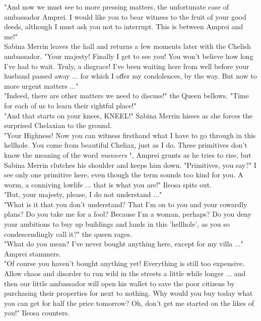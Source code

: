 "And now we must see to more pressing matters, the unfortunate case of ambassador Amprei. I would like you to bear witness to the fruit of your good deeds, although I must ask you not to interrupt. This is between Amprei and me!"\\

Sabina Merrin leaves the hall and returns a few moments later with the Chelish ambassador. "Your majesty! Finally I get to see you! You won't believe how long I've had to wait. Truly, a disgrace! I've been waiting here from well before your husband passed away ... for which I offer my condolences, by the way. But now to more urgent matters ..."\\

"Indeed, there are other matters we need to discuss!" the Queen bellows. "Time for each of us to learn their rightful place!"\\

"And that starts on your knees, KNEEL!" Sabina Merrin hisses as she forces the surprised Chelaxian to the ground.\\

"Your Highness! Now you can witness firsthand what I have to go through in this hellhole. You come from beautiful Cheliax, just as I do. These primitives don't know the meaning of the word {\itshape manners} ", Amprei grunts as he tries to rise, but Sabina Merrin clutches his shoulder and keeps him down. "Primitives, you say?" I see only one primitive here, even though the term sounds too kind for you. A worm, a conniving lowlife ... that is what you are!" Ileosa spits out.\\

"But, your majesty, please, I do not understand ..."\\

"What is it that you don't understand? That I'm on to you and your cowardly plans? Do you take me for a fool? Because I'm a woman, perhaps? Do you deny your ambitions to buy up buildings and lands in this 'hellhole', as you so condescendingly call it?" the queen rages.\\

"What do you mean? I've never bought anything here, except for my villa ..." Amprei stammers.\\

"Of course you haven't bought anything yet! Everything is still too expensive. Allow chaos and disorder to run wild in the streets a little while longer ... and then our little ambassador will open his wallet to save the poor citizens by purchasing their properties for next to nothing. Why would you buy today what you can get for half the price tomorrow? Oh, don't get me started on the likes of you!" Ileosa counters.\\

